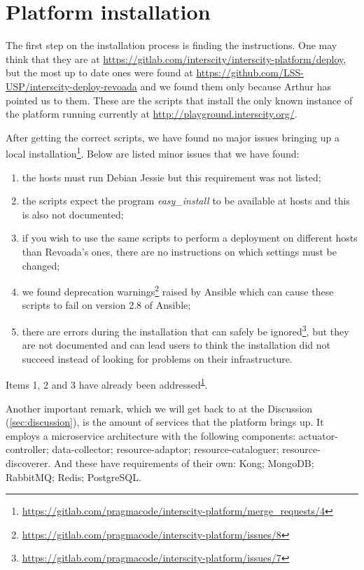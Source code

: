 \documentclass[paper=a4, fontsize=11pt]{scrartcl}
\numberwithin{equation}{section}    %
\numberwithin{figure}{section}      %
\numberwithin{table}{section}        %
\begin{document}
\section{Platform installation}
\label{sec:platinst}
  The first step on the installation process is finding the instructions. One may think that they are at \url{https://gitlab.com/interscity/interscity-platform/deploy}, but the most up to date ones were found at \url{https://github.com/LSS-USP/interscity-deploy-revoada} and we found them only because Arthur has pointed us to them. These are the scripts that install the only known instance of the platform running currently at \url{http://playground.interscity.org/}.

  After getting the correct scripts, we have found no major issues bringing up a local installation\footnote{\label{installation-mr}\url{https://gitlab.com/pragmacode/interscity-platform/merge_requests/4}}. Below are listed minor issues that we have found:

  \begin{enumerate}
    \item the hosts must run Debian Jessie but this requirement was not listed;
    \item the scripts expect the program \textit{easy\_install} to be available at hosts and this is also not documented;
    \item if you wish to use the same scripts to perform a deployment on different hosts than Revoada's ones, there are no instructions on which settings must be changed;
    \item we found deprecation warnings\footnote{\url{https://gitlab.com/pragmacode/interscity-platform/issues/8}} raised by Ansible which can cause these scripts to fail on version 2.8 of Ansible;
    \item there are errors during the installation that can safely be ignored\footnote{\url{https://gitlab.com/pragmacode/interscity-platform/issues/7}}, but they are not documented and can lead users to think the installation did not succeed instead of looking for problems on their infrastructure.
  \end{enumerate}

  Items 1, 2 and 3 have already been addressed\textsuperscript{\ref{installation-mr}}.

  Another important remark, which we will get back to at the Discussion (\ref{sec:discussion}), is the amount of services that the platform brings up. It employs a microservice architecture with the following components: actuator-controller; data-collector; resource-adaptor; resource-cataloguer; resource-discoverer. And these have requirements of their own: Kong; MongoDB; RabbitMQ; Redis; PostgreSQL.
\end{document}
